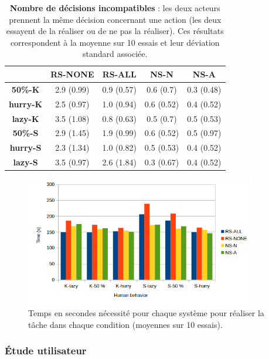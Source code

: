 \documentclass[english,a4paper,11pt,twoside]{StyleThese}
\begin{document}
\begin{table}[!h]
\centering
  \begin{tabular}{|c||c|c|c|c|}
  \hline
     & \textbf{RS-NONE} & \textbf{RS-ALL} & \textbf{NS-N} & \textbf{NS-A} \\
  \hline
  \hline
     \textbf{50\%-K} & 2.9 (0.99) & 0.9 (0.57) & 0.6 (0.7) & 0.3 (0.48) \\
  \hline
     \textbf{hurry-K} & 2.5 (0.97) & 1.0 (0.94) & 0.6 (0.52) & 0.4 (0.52)\\
  \hline
     \textbf{lazy-K} & 3.5 (1.08) & 0.8 (0.63) & 0.5 (0.7) & 0.5 (0.53) \\
  \hline
     \textbf{50\%-S} & 2.9 (1.45) & 1.9 (0.99) & 0.6 (0.52) & 0.5 (0.97) \\
  \hline
     \textbf{hurry-S} & 2.3 (1.34) & 1.0 (0.82) & 0.5 (0.53) & 0.4 (0.52) \\
  \hline
     \textbf{lazy-S} & 3.5 (0.97) & 2.6 (1.84) & 0.3 (0.67) & 0.4 (0.52)  \\
  \hline
  \end{tabular}
   \caption{\textbf{Nombre de décisions incompatibles} : les deux acteurs prennent la même décision concernant une action (les deux essayent de la réaliser ou de ne pas la réaliser). Ces résultats correspondent à la moyenne sur 10 essais et leur déviation standard associée.}
   \label{tab:incompatibleDecisions} 
\end{table}

\begin{figure}[!h]
	\centering
    \includegraphics[width=0.9\textwidth]{figs/Chapter5/Time.png}    \caption{Temps en secondes nécessité pour chaque système pour réaliser la tâche dans chaque condition (moyennes sur 10 essais).}
    \label{fig:resTime}
\end{figure}

\subsubsection{Étude utilisateur}
\end{document}
